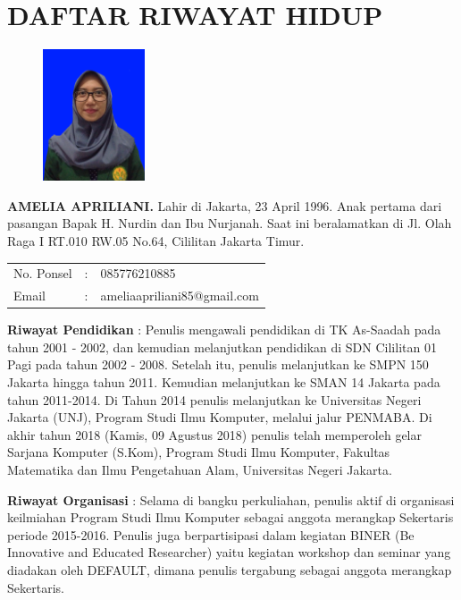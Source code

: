 \pagestyle{empty}
\chapter*{\centering \large DAFTAR RIWAYAT HIDUP}
\thispagestyle{empty}

\begin{figure}
	\vspace{-25pt}
	\begin{center}
		\includegraphics[width=0.27\textwidth]{gambar/pas-foto}
	\end{center}
	\vspace{-80pt}
\end{figure}

\noindent \textbf{AMELIA APRILIANI.}  Lahir di Jakarta, 23 April 1996.  Anak pertama dari pasangan Bapak H. Nurdin dan Ibu Nurjanah. Saat ini beralamatkan di Jl. Olah Raga I RT.010 RW.05 No.64, Cililitan Jakarta Timur.

\vspace{0.5cm}
\noindent
\begin{center}
	\begin{flushright}
		\begin{tabular}{lcl}
			No. Ponsel	& :&  085776210885 \\
			Email	& :&  ameliaapriliani85@gmail.com
		\end{tabular}
	\end{flushright}
\end{center}
\vspace{0.5cm}

\noindent \textbf{Riwayat Pendidikan} : Penulis mengawali pendidikan di TK As-Saadah pada tahun 2001 - 2002, dan kemudian melanjutkan pendidikan di SDN Cililitan 01 Pagi pada tahun 2002 - 2008. Setelah itu, penulis melanjutkan ke SMPN 150 Jakarta hingga tahun 2011. Kemudian melanjutkan ke SMAN 14 Jakarta pada tahun 2011-2014. Di Tahun 2014 penulis melanjutkan ke Universitas Negeri Jakarta (UNJ), Program Studi Ilmu Komputer, melalui jalur PENMABA. Di akhir tahun 2018 (Kamis, 09 Agustus 2018) penulis telah memperoleh gelar Sarjana Komputer (S.Kom), Program Studi Ilmu Komputer, Fakultas Matematika dan Ilmu Pengetahuan Alam, Universitas Negeri Jakarta.

\noindent \textbf{Riwayat Organisasi} : Selama di bangku perkuliahan, penulis aktif di organisasi keilmiahan Program Studi Ilmu Komputer sebagai anggota merangkap Sekertaris periode 2015-2016. Penulis juga berpartisipasi dalam kegiatan BINER (Be Innovative and Educated Researcher) yaitu kegiatan workshop dan seminar yang diadakan oleh DEFAULT, dimana penulis tergabung sebagai anggota merangkap Sekertaris. 